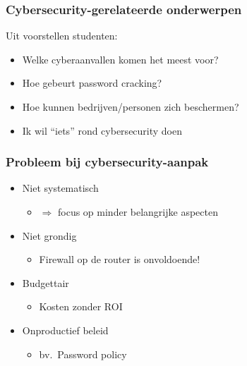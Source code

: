 \documentclass[aspectratio=169]{beamer}
\begin{document}
\begin{frame}
  \frametitle{Cybersecurity-gerelateerde onderwerpen}

  Uit voorstellen studenten:

  \begin{itemize}
    \item Welke cyberaanvallen komen het meest voor?
    \item Hoe gebeurt password cracking?
    \item Hoe kunnen bedrijven/personen zich beschermen?
    \item Ik wil ``iets'' rond cybersecurity doen
  \end{itemize}

  \bigskip


\end{frame}

\begin{frame}
  \frametitle{Probleem bij cybersecurity-aanpak}

  \begin{itemize}
    \item Niet systematisch
    \begin{itemize}
      \item $\Rightarrow$ focus op minder belangrijke aspecten
    \end{itemize}
    \item Niet grondig
    \begin{itemize}
      \item Firewall op de router is onvoldoende!
    \end{itemize}
    \item Budgettair
    \begin{itemize}
      \item Kosten zonder ROI
    \end{itemize}
    \item Onproductief beleid
    \begin{itemize}
      \item bv.\ Password policy
    \end{itemize}
  \end{itemize}

\end{frame}
\end{document}
